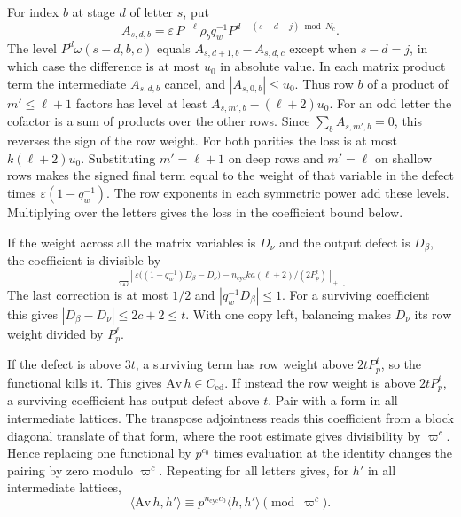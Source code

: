 For index \(b\) at stage \(d\) of letter \(s\), put
\[
 A_{s,d,b}=\varepsilon\,P^{-\ell}\rho_b
                 q_w^{-1}P^{d+(s-d-j)\bmod N_c}.
\]
The level \(P^d\omega(s-d,b,c)\) equals
\(A_{s,d+1,b}-A_{s,d,c}\) except when \(s-d=j\), in which case the
difference is at most \(u_0\) in absolute value. In each matrix
product term the intermediate \(A_{s,d,b}\) cancel, and
\(|A_{s,0,b}|\le u_0\). Thus row \(b\) of a product of
\(m'\le\ell+1\) factors has level at least
\(A_{s,m',b}-(\ell+2)u_0\). For an odd letter the cofactor is a sum
of products over the other rows. Since \(\sum_b A_{s,m',b}=0\),
this reverses the sign of the row weight. For both parities the
loss is at most \(k(\ell+2)u_0\). Substituting \(m'=\ell+1\) on
deep rows and \(m'=\ell\) on shallow rows makes the signed
final term equal to the weight of that variable in the defect
times \(\varepsilon(1-q_w^{-1})\). The row exponents in each
symmetric power add these levels. Multiplying over the letters
gives the loss in the coefficient bound below.

If the weight across all the matrix
variables is \(D_\nu\) and the output defect is \(D_\beta\),
the coefficient is divisible by
\[
 \varpi^{\left\lceil
      \varepsilon\bigl((1-q_w^{-1})D_\beta-D_\nu\bigr)
      -n_\mathrm{cyc}ka(\ell+2)/(2P_p^\ell)
                 \right\rceil_+}.
\]
The last correction is at most \(1/2\) and
\(|q_w^{-1}D_\beta|\le1\). For a surviving coefficient this
gives \(|D_\beta-D_\nu|\le2c+2\le t\).
With one copy left, balancing makes \(D_\nu\) its row weight
divided by \(P_p^\ell\).

If the defect is above \(3t\), a surviving term has row weight
above \(2tP_p^\ell\), so the functional kills it.
This gives \(\mathrm{Av}\,h\in C_\mathrm{ed}\).
If instead the row weight is above \(2tP_p^\ell\), a surviving
coefficient has output defect above \(t\). Pair with a form in
all intermediate lattices. The transpose adjointness reads
this coefficient from a block diagonal translate of that
form, where the root estimate gives divisibility by \(\varpi^c\).
Hence replacing one functional by \(p^{c_0}\) times evaluation
at the identity changes the pairing by zero modulo \(\varpi^c\).
Repeating for all letters gives, for \(h'\) in all intermediate
lattices,
\[
 \langle\mathrm{Av}\,h,h'\rangle
      \equiv p^{n_\mathrm{cyc}c_0}\langle h,h'\rangle\pmod{\varpi^c}.
\]

